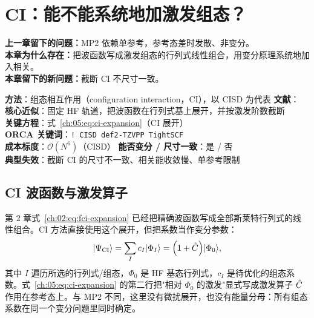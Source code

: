
\section{CI：能不能系统地加激发组态？}
\label{ch:05:sec:title}

\begin{problemchain}
\textbf{上一章留下的问题：}MP2 依赖单参考，参考态差时发散、非变分。\\
\textbf{本章为什么存在：}把波函数写成激发组态的行列式线性组合，用变分原理系统地加入相关。\\
\textbf{本章留下的新问题：}截断 CI 不尺寸一致。
\end{problemchain}

\begin{methodcard}
\textbf{方法}：组态相互作用（configuration interaction，CI），以 CISD 为代表\quad
\textbf{文献}：\citep{knowles1988,szabo1996,helgaker2000}\\
\textbf{核心近似}：固定 HF 轨道，把波函数在行列式基上展开，并按激发阶数截断\\
\textbf{关键方程}：式~\eqref{ch:05:eq:ci-expansion}（CI 展开）\\
\textbf{ORCA 关键词}：\texttt{! CISD def2-TZVPP TightSCF}\\
\textbf{成本标度}：$\mathcal{O}(N^6)$（CISD）\quad
\textbf{能否变分 / 尺寸一致}：是 / 否\\
\textbf{典型失效}：截断 CI 的尺寸不一致、相关能收敛慢、单参考限制
\end{methodcard}

\subsection{CI 波函数与激发算子}
\label{ch:05:sec:ci-wavefunction}

第 2 章式~\eqref{ch:02:eq:fci-expansion} 已经把精确波函数写成全部斯莱特行列式的线性组合。CI 方法直接使用这个展开，但把系数当作变分参数\citep{szabo1996,helgaker2000}：
\begin{equation}
\lvert \Psi_{\mathrm{CI}}\rangle
= \sum_I c_I \lvert \Phi_I\rangle
= \Big(1+\hat{C}\Big)\lvert \Phi_0\rangle,
\label{ch:05:eq:ci-expansion}
\end{equation}
其中 $I$ 遍历所选的行列式/组态，$\Phi_0$ 是 HF 基态行列式，$c_I$ 是待优化的组态系数。式~\eqref{ch:05:eq:ci-expansion} 的第二行把"相对 $\Phi_0$ 的激发"显式写成激发算子 $\hat{C}$ 作用在参考态上。与 MP2 不同，这里没有微扰展开，也没有能量分母：所有组态系数在同一个变分问题里同时确定。

